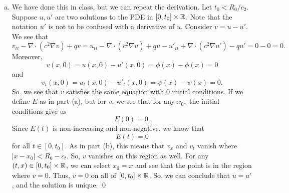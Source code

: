 \documentclass{article}
\newcommand{\D}{\nabla}
\begin{document}
\begin{enumerate}[(a)]
    \item We have done this in class, but we can repeat the derivation. Let $t_0 < R_0/c_2$. Suppose $u, u'$ are two solutions to the PDE in $[0, t_0] \times \mathbb{R}$. Note that the notation $u'$ is not to be confused with a derivative of $u$. Consider $v=u -u'$. We see that 
    \[v_{tt} - \D \cdot (c^2 \D v) +qv =  u_{tt} - \D \cdot (c^2 \D u) +qu - u'_{tt} + \D \cdot (c^2 \D u') -qu' = 0 - 0 = 0.\]
    Moreover, 
    \[v(x,0) = u(x,0) - u'(x,0)= \phi(x)- \phi(x)=0\]
    and 
    \[v_t(x,0) = u_t(x,0) - u'_t(x,0)= \psi(x)- \psi(x)=0.\]
    So, we see that $v$ satisfies the same equation with 0 initial conditions. If we define $E$ as in part (a), but for $v$, we see that for any $x_0,$ the initial conditions give us 
    \[E(0) = 0.\]
    Since $E(t)$ is non-increasing and non-negative, we know that 
    \[E(t) = 0\]
    for all $t \in [0,t_0]$. As in part (b), this means that $v_x$ and $v_t$ vanish where $|x - x_0| < R_0-c_t$. So, $v$ vanishes on this region as well. For any $(t,x) \in [0,t_0] \times \mathbb{R}$, we can select $x_0 = x$ and see that the point is in the region where $v =0$. Thus,  $v = 0$ on all of $[0,t_0] \times \mathbb{R}$. 
    \hop 
    So, we can conclude that $u = u'$, and the solution is unique. \qed

\end{enumerate}
\end{document}
